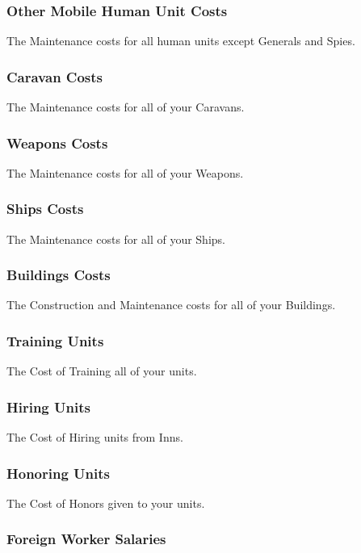 \subsubsection{Other Mobile Human Unit Costs}

The Maintenance costs for all human units except Generals and Spies.

\subsubsection{Caravan Costs}

The Maintenance costs for all of your Caravans.

\subsubsection{Weapons Costs}

The Maintenance costs for all of your Weapons.

\subsubsection{Ships Costs}

The Maintenance costs for all of your Ships.

\subsubsection{Buildings Costs}

The Construction and Maintenance costs for all of your Buildings.

\subsubsection{Training Units}

The Cost of Training all of your units.

\subsubsection{Hiring Units}

The Cost of Hiring units from Inns.

\subsubsection{Honoring Units}

The Cost of Honors given to your units.

\subsubsection{Foreign Worker Salaries}

